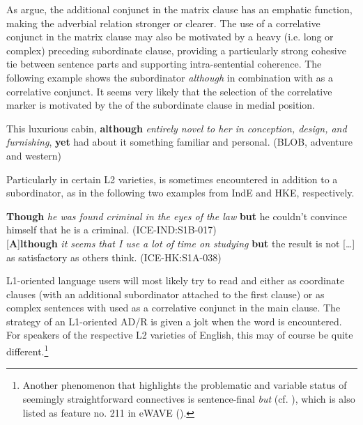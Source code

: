 As \citet[1001]{QuirkEtAl1985} argue, the additional conjunct in the matrix clause has an emphatic function, making the adverbial relation stronger or clearer. The use of a correlative conjunct in the matrix clause may also be motivated by a heavy (i.e. long or complex) preceding subordinate clause, providing a particularly strong cohesive tie between sentence parts and supporting intra-sentential coherence. The following example shows the subordinator \textit{although} in combination with  as a correlative conjunct. It seems very likely that the selection of the correlative marker is motivated by the  of the subordinate clause in medial position.

\ea\label{ex:68}This luxurious cabin, \textbf{although} \textit{entirely novel to her in conception, design, and furnishing}, \textbf{yet} had about it something familiar and personal. (BLOB, adventure and western)
\z

Particularly in certain L2 varieties,  is sometimes encountered in addition to a subordinator, as in the following two examples from IndE and HKE, respectively.

\ea\label{ex:69}\label{bkm:Ref488839457}\textbf{Though} \textit{he was found criminal in the eyes of the law} \textbf{but} he couldn’t convince himself that he is a criminal. (ICE-IND:S1B-017)\\
    \ex\label{ex:70}\label{bkm:Ref488839458}[\textbf{A}]\textbf{lthough} \textit{it seems that I use a lot of time on studying} \textbf{but} the result is not […] as satisfactory as others think. (ICE-HK:S1A-038)\\
\z

L1-oriented language users will most likely try to read  and  either as coordinate clauses (with an additional subordinator attached to the first clause) or as complex sentences with  used as a correlative conjunct in the main clause. The  strategy of an L1-oriented AD/R is given a jolt when the word  is encountered. For speakers of the respective L2 varieties of English, this may of course be quite different.\footnote{Another phenomenon that highlights the problematic and variable status of seemingly straightforward connectives is sentence-final \textit{but} (cf. \citealt{MulderThompson2008,MulderEtAl2009,Hancil2014,IzutsuIzutsu2014}), which is also listed as feature no. 211 in eWAVE (\citealt{KortmannEtAl2020}).}

